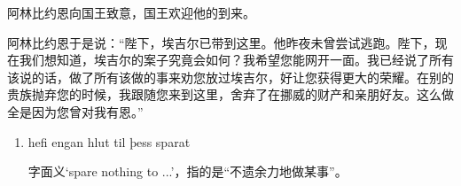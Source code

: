 \begin{translation*}{}
    阿林比约恩向国王致意，国王欢迎他的到来。

    阿林比约恩于是说：“陛下，埃吉尔已带到这里。他昨夜未曾尝试逃跑。陛下，现在我们想知道，埃吉尔的案子究竟会如何？我希望您能网开一面。我已经说了所有该说的话，做了所有该做的事来劝您放过埃吉尔，好让您获得更大的荣耀。在别的贵族抛弃您的时候，我跟随您来到这里，舍弃了在挪威的财产和亲朋好友。这么做全是因为您曾对我有恩。”
\end{translation*}
\begin{grammar*}{}
    \begin{enumerate}[leftmargin=*]
        \item hefi engan hlut til þess sparat

              字面义`spare nothing to ...'，指的是“不遗余力地做某事”。
    \end{enumerate}
\end{grammar*}

